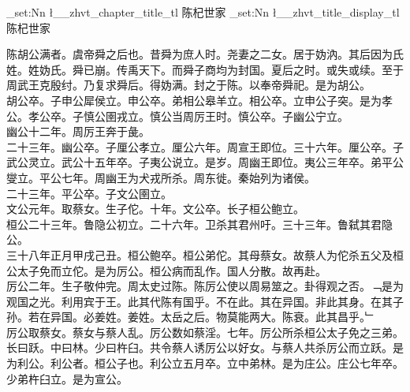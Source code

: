 \documentclass{zhvt-classic}
\begin{document}
\clearpage
\ExplSyntaxOn
\tl_set:Nn \l__zhvt_chapter_title_tl { 陈杞世家 }
\tl_set:Nn \l__zhvt_title_display_tl { 陈杞世家 }
\ExplSyntaxOff
\maketitle


\hspace*{2em}陈胡公满者。虞帝舜之后也。昔舜为庶人时。尧妻之二女。居于妫汭。其后因为氏姓。姓妫氏。舜已崩。传禹天下。而舜子商均为封国。夏后之时。或失或续。至于周武王克殷纣。乃复求舜后。得妫满。封之于陈。以奉帝舜祀。是为胡公。\\
\hspace*{2em}胡公卒。子申公犀侯立。申公卒。弟相公皋羊立。相公卒。立申公子突。是为孝公。孝公卒。子慎公圉戎立。慎公当周厉王时。慎公卒。子幽公宁立。\\
\hspace*{2em}幽公十二年。周厉王奔于彘。\\
\hspace*{2em}二十三年。幽公卒。子厘公孝立。厘公六年。周宣王即位。三十六年。厘公卒。子武公灵立。武公十五年卒。子夷公说立。是岁。周幽王即位。夷公三年卒。弟平公燮立。平公七年。周幽王为犬戎所杀。周东徙。秦始列为诸侯。\\
\hspace*{2em}二十三年。平公卒。子文公圉立。\\
\hspace*{2em}文公元年。取蔡女。生子佗。十年。文公卒。长子桓公鲍立。\\
\hspace*{2em}桓公二十三年。鲁隐公初立。二十六年。卫杀其君州吁。三十三年。鲁弑其君隐公。\\
\hspace*{2em}三十八年正月甲戌己丑。桓公鲍卒。桓公弟佗。其母蔡女。故蔡人为佗杀五父及桓公太子免而立佗。是为厉公。桓公病而乱作。国人分散。故再赴。\\
\hspace*{2em}厉公二年。生子敬仲完。周太史过陈。陈厉公使以周易筮之。卦得观之否。﹁是为观国之光。利用宾于王。此其代陈有国乎。不在此。其在异国。非此其身。在其子孙。若在异国。必姜姓。姜姓。太岳之后。物莫能两大。陈衰。此其昌乎。﹂\\
\hspace*{2em}厉公取蔡女。蔡女与蔡人乱。厉公数如蔡淫。七年。厉公所杀桓公太子免之三弟。长曰跃。中曰林。少曰杵臼。共令蔡人诱厉公以好女。与蔡人共杀厉公而立跃。是为利公。利公者。桓公子也。利公立五月卒。立中弟林。是为庄公。庄公七年卒。少弟杵臼立。是为宣公。\\
\end{document}

